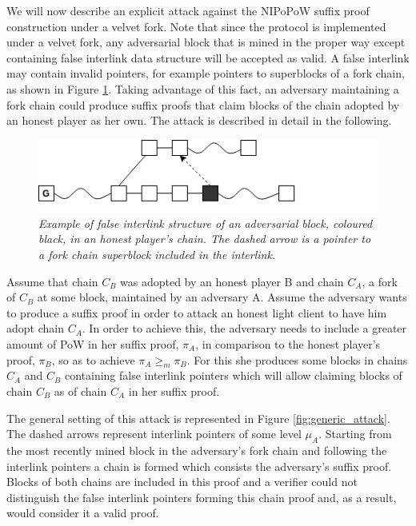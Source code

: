 We  will now describe an explicit attack against the NIPoPoW suffix proof construction under a
velvet fork. Note that since the protocol is implemented under a velvet fork, any adversarial
block that is mined in the proper way except containing false interlink data structure will
be accepted as valid. A false interlink may contain invalid pointers, for example pointers
to superblocks of a fork chain, as shown in Figure \ref{fig:false_interlink}.
Taking advantage of this fact, an adversary maintaining a fork chain could produce suffix proofs
that claim blocks of the chain adopted by an honest player as her own. The attack is described
in detail in the following.

\begin{figure}[h]
	\begin{center}
		\includegraphics[scale=0.6]{figures/false_interlink.png}
	\end{center}
	\caption{\textit{Example of false interlink structure of an adversarial block, coloured black,
	in an honest player's chain. The dashed arrow is a pointer to a fork chain superblock included
	in the interlink.}}
	\label{fig:false_interlink}
\end{figure}

Assume that chain $C_B$ was adopted by an honest player B and chain $C_A$, a fork of $C_B$ at
some block, maintained by an adversary A. Assume the adversary wants to produce a suffix proof
in order to attack an honest light client to have him adopt chain $C_A$. In order to achieve this,
the adversary needs to include a greater amount of PoW in her suffix proof, $\pi_A$, in comparison
to the honest player's proof, $\pi_B$, so as to achieve $\pi_A \geq_m \pi_B$. For this she produces
some blocks in chains $C_A$ and $C_B$ containing false interlink pointers which will allow
claiming blocks of chain $C_B$ as of chain $C_A$ in her suffix proof.

The general setting of this attack is represented in Figure \ref{fig:generic_attack}. The dashed
arrows represent interlink pointers of some level $\mu_A$. Starting from the most recently mined
block in the adversary's fork chain and following the interlink pointers a chain is formed which
consists the adversary's suffix proof. Blocks of both chains are included in this proof and a
verifier could not distinguish the false interlink pointers forming this chain proof and, as a
result, would consider it a valid proof.


